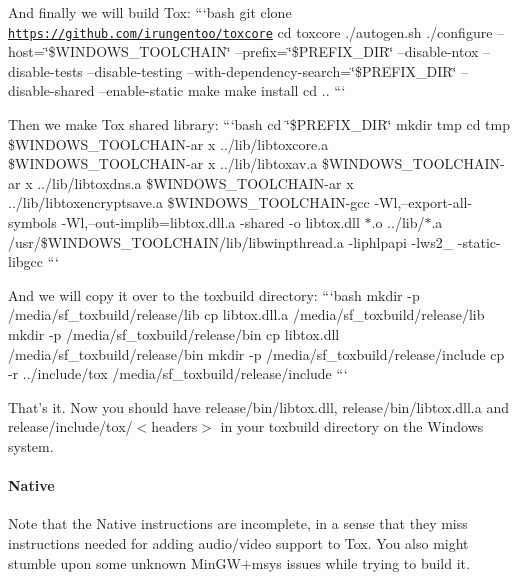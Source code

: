 And finally we will build Tox\+: ```bash git clone \href{https://github.com/irungentoo/toxcore}{\tt https\+://github.\+com/irungentoo/toxcore} cd toxcore ./autogen.sh ./configure --host=\char`\"{}\$\+W\+I\+N\+D\+O\+W\+S\+\_\+\+T\+O\+O\+L\+C\+H\+A\+I\+N\char`\"{} --prefix=\char`\"{}\$\+P\+R\+E\+F\+I\+X\+\_\+\+D\+I\+R\char`\"{} --disable-\/ntox --disable-\/tests --disable-\/testing --with-\/dependency-\/search=\char`\"{}\$\+P\+R\+E\+F\+I\+X\+\_\+\+D\+I\+R\char`\"{} --disable-\/shared --enable-\/static make make install cd .. ```

Then we make Tox shared library\+: ```bash cd \char`\"{}\$\+P\+R\+E\+F\+I\+X\+\_\+\+D\+I\+R\char`\"{} mkdir tmp cd tmp \$\+W\+I\+N\+D\+O\+W\+S\+\_\+\+T\+O\+O\+L\+C\+H\+A\+I\+N-\/ar x ../lib/libtoxcore.a \$\+W\+I\+N\+D\+O\+W\+S\+\_\+\+T\+O\+O\+L\+C\+H\+A\+I\+N-\/ar x ../lib/libtoxav.a \$\+W\+I\+N\+D\+O\+W\+S\+\_\+\+T\+O\+O\+L\+C\+H\+A\+I\+N-\/ar x ../lib/libtoxdns.a \$\+W\+I\+N\+D\+O\+W\+S\+\_\+\+T\+O\+O\+L\+C\+H\+A\+I\+N-\/ar x ../lib/libtoxencryptsave.a \$\+W\+I\+N\+D\+O\+W\+S\+\_\+\+T\+O\+O\+L\+C\+H\+A\+I\+N-\/gcc -\/\+Wl,--export-\/all-\/symbols -\/\+Wl,--out-\/implib=libtox.\+dll.\+a -\/shared -\/o libtox.\+dll $\ast$.o ../lib/$\ast$.a /usr/\$\+W\+I\+N\+D\+O\+W\+S\+\_\+\+T\+O\+O\+L\+C\+H\+A\+I\+N/lib/libwinpthread.a -\/liphlpapi -\/lws2\+\_ -\/static-\/libgcc ```

And we will copy it over to the {\ttfamily toxbuild} directory\+: ```bash mkdir -\/p /media/sf\+\_\+toxbuild/release/lib cp libtox.\+dll.\+a /media/sf\+\_\+toxbuild/release/lib mkdir -\/p /media/sf\+\_\+toxbuild/release/bin cp libtox.\+dll /media/sf\+\_\+toxbuild/release/bin mkdir -\/p /media/sf\+\_\+toxbuild/release/include cp -\/r ../include/tox /media/sf\+\_\+toxbuild/release/include ```

That's it. Now you should have {\ttfamily release/bin/libtox.\+dll}, {\ttfamily release/bin/libtox.\+dll.\+a} and {\ttfamily release/include/tox/$<$headers$>$} in your {\ttfamily toxbuild} directory on the Windows system.

\label{_windows-native}%
 \paragraph*{Native}

Note that the Native instructions are incomplete, in a sense that they miss instructions needed for adding audio/video support to Tox. You also might stumble upon some unknown Min\+G\+W+msys issues while trying to build it.

